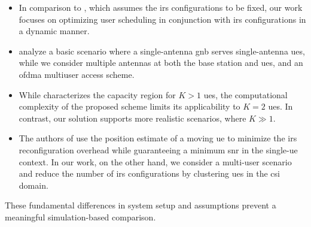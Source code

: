 \begin{itemize}
\item In comparison to \cite{Lee23Harmony}, which assumes the \gls{irs} configurations to be fixed, %
our work focuses on optimizing user scheduling in conjunction with \gls{irs} configurations in a dynamic manner. %
\item \cite{guo2021intelligent, mu2021capacity} analyze a basic scenario where a single-antenna \gls{gnb} serves single-antenna \glspl{ue}, while we consider multiple antennas at both the base station and \glspl{ue}, and an \gls{ofdma} multiuser access scheme. 
\item %
While \cite{mu2021capacity} characterizes the capacity region for %
$K>1$ \glspl{ue}, the computational complexity of the proposed scheme limits its applicability to $K=2$ \glspl{ue}. In contrast, our solution supports more realistic scenarios,  where $K \gg 1$.
\item The authors of \cite{jamali2022low} use the position estimate of a moving \gls{ue} to minimize the \gls{irs} reconfiguration overhead while guaranteeing a minimum \gls{snr} in the single-\gls{ue} context. In our work, on the other hand, 
we consider a multi-user scenario and reduce the number of \gls{irs} configurations by clustering \glspl{ue} in the \gls{csi} domain.
\end{itemize}
These fundamental differences in system setup and assumptions prevent a meaningful simulation-based comparison.

